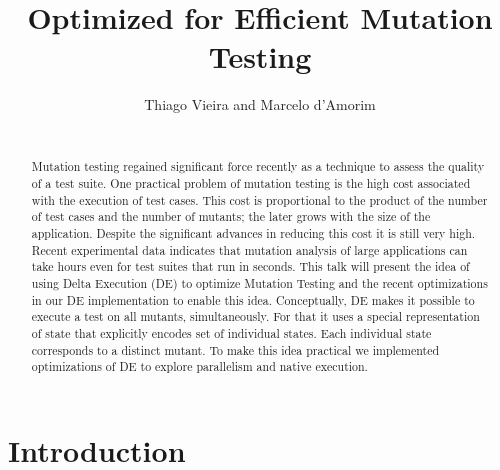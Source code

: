 \documentclass{sig-alternate}
\begin{document}
\title{Optimized \dE{} for Efficient Mutation Testing}

\author{
\alignauthor
Thiago Vieira and Marcelo d'Amorim\\
       \\
}



\maketitle


\begin{abstract}
  Mutation testing
regained significant force recently as a technique to assess the
quality of a test suite.  One practical problem of mutation testing is
the high cost associated with the execution of test cases.  This cost
is proportional to the product of the number of test cases and the
number of mutants; the later grows with the size of the application.
Despite the significant advances in reducing this cost it is still
very high.  Recent experimental data indicates that mutation analysis
of large applications can take hours even for test suites that run in
seconds.  This talk will present the idea of using Delta Execution
(DE) to optimize Mutation Testing and the recent optimizations in our
DE implementation to enable this idea.  Conceptually, DE makes it
possible to execute a test on all mutants, simultaneously.  For that
it uses a special representation of state that explicitly encodes set
of individual states.  Each individual state corresponds to a distinct
mutant.  To make this idea practical we implemented optimizations of
DE to explore parallelism and native execution.
\end{abstract}

\section{Introduction}
\end{document}
